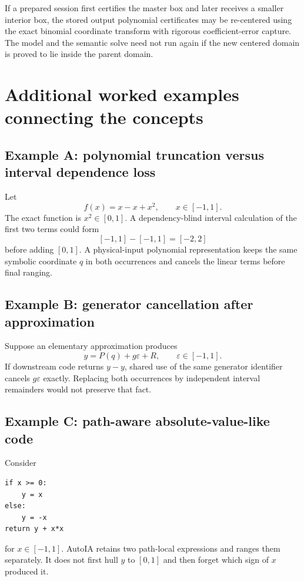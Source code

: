 \documentclass[11pt]{article}
\begin{document}
If a prepared session first certifies the master box and later receives a smaller
interior box, the stored output polynomial certificates may be re-centered using
the exact binomial coordinate transform with rigorous coefficient-error capture.
The model and the semantic solve need not run again if the new centered domain is
proved to lie inside the parent domain.

\section{Additional worked examples connecting the concepts}

\subsection{Example A: polynomial truncation versus interval dependence loss}

Let
\[
  f(x)=x-x+x^2,
  \qquad x\in[-1,1].
\]
The exact function is \(x^2\in[0,1]\).  A dependency-blind interval calculation
of the first two terms could form
\[
  [-1,1]-[-1,1]=[-2,2]
\]
before adding \([0,1]\).  A physical-input polynomial representation keeps the
same symbolic coordinate \(q\) in both occurrences and cancels the linear terms
before final ranging.

\subsection{Example B: generator cancellation after approximation}

Suppose an elementary approximation produces
\[
  y=P(q)+g\varepsilon+R,
  \qquad \varepsilon\in[-1,1].
\]
If downstream code returns \(y-y\), shared use of the same generator identifier
cancels \(g\varepsilon\) exactly.  Replacing both occurrences by independent
interval remainders would not preserve that fact.

\subsection{Example C: path-aware absolute-value-like code}

Consider
\begin{verbatim}
if x >= 0:
    y = x
else:
    y = -x
return y + x*x
\end{verbatim}
for \(x\in[-1,1]\).  AutoIA retains two path-local expressions and ranges them
separately.  It does not first hull \(y\) to \([0,1]\) and then forget which sign
of \(x\) produced it.
\end{document}
